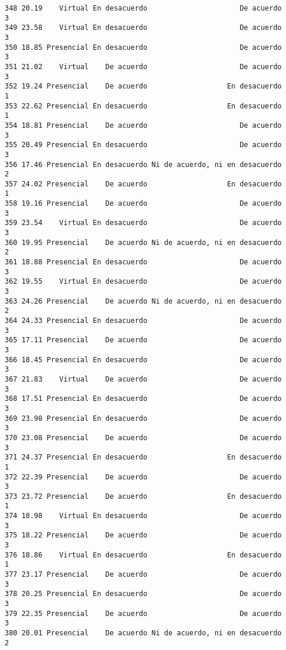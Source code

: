 \documentclass[
  letterpaper,
  DIV=11,
  numbers=noendperiod]{scrartcl}
\begin{document}
\begin{verbatim}
348 20.19    Virtual En desacuerdo                      De acuerdo           3
349 23.58    Virtual En desacuerdo                      De acuerdo           3
350 18.85 Presencial En desacuerdo                      De acuerdo           3
351 21.02    Virtual    De acuerdo                      De acuerdo           3
352 19.24 Presencial    De acuerdo                   En desacuerdo           1
353 22.62 Presencial En desacuerdo                   En desacuerdo           1
354 18.81 Presencial    De acuerdo                      De acuerdo           3
355 20.49 Presencial En desacuerdo                      De acuerdo           3
356 17.46 Presencial En desacuerdo Ni de acuerdo, ni en desacuerdo           2
357 24.02 Presencial    De acuerdo                   En desacuerdo           1
358 19.16 Presencial    De acuerdo                      De acuerdo           3
359 23.54    Virtual En desacuerdo                      De acuerdo           3
360 19.95 Presencial    De acuerdo Ni de acuerdo, ni en desacuerdo           2
361 18.88 Presencial En desacuerdo                      De acuerdo           3
362 19.55    Virtual En desacuerdo                      De acuerdo           3
363 24.26 Presencial    De acuerdo Ni de acuerdo, ni en desacuerdo           2
364 24.33 Presencial En desacuerdo                      De acuerdo           3
365 17.11 Presencial    De acuerdo                      De acuerdo           3
366 18.45 Presencial En desacuerdo                      De acuerdo           3
367 21.83    Virtual    De acuerdo                      De acuerdo           3
368 17.51 Presencial En desacuerdo                      De acuerdo           3
369 23.98 Presencial En desacuerdo                      De acuerdo           3
370 23.08 Presencial    De acuerdo                      De acuerdo           3
371 24.37 Presencial En desacuerdo                   En desacuerdo           1
372 22.39 Presencial    De acuerdo                      De acuerdo           3
373 23.72 Presencial    De acuerdo                   En desacuerdo           1
374 18.98    Virtual En desacuerdo                      De acuerdo           3
375 18.22 Presencial    De acuerdo                      De acuerdo           3
376 18.86    Virtual En desacuerdo                   En desacuerdo           1
377 23.17 Presencial    De acuerdo                      De acuerdo           3
378 20.25 Presencial En desacuerdo                      De acuerdo           3
379 22.35 Presencial    De acuerdo                      De acuerdo           3
380 20.01 Presencial    De acuerdo Ni de acuerdo, ni en desacuerdo           2

\end{verbatim}
\end{document}
